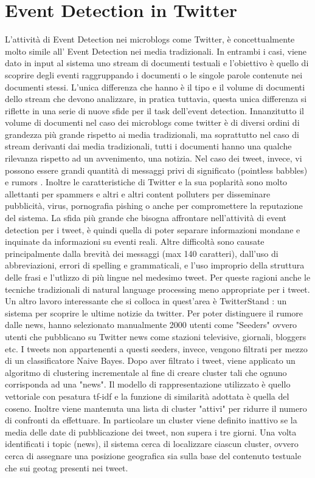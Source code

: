 \section{Event Detection in Twitter}
L'attività di Event Detection nei microblogs come Twitter, è concettualmente molto simile all' Event Detection nei media tradizionali. In entrambi i casi, viene dato in input al sistema  uno stream di documenti testuali e l'obiettivo è quello di scoprire degli eventi raggruppando i documenti o le singole parole contenute nei documenti stessi. L'unica differenza che hanno è il tipo e il volume di documenti dello stream che devono analizzare, in pratica tuttavia, questa unica differenza si riflette in una serie di nuove sfide per il task dell'event detection. 
Innanzitutto il volume di documenti nel caso dei microblogs come twitter  è di diversi ordini di grandezza più grande rispetto ai media tradizionali, ma soprattutto nel caso di stream derivanti dai media tradizionali, tutti i documenti hanno una qualche rilevanza rispetto ad un avvenimento, una notizia. Nel caso dei tweet, invece, vi possono essere grandi quantità di messaggi privi di significato (pointless babbles) \cite{DBLP:conf/icwsm/HurlockW11} e rumors \cite{Castillo:2011:ICT:1963405.1963500}. Inoltre le caratteristiche di Twitter e la sua poplarità sono molto allettanti per spammers e altri e altri content polluters \cite{DBLP:conf/icwsm/LeeEC11} per disseminare pubblicità, virus, pornografia pishing o anche per compromettere la reputazione del sistema. La sfida più grande che bisogna affrontare nell'attività di event detection per i tweet, è quindi quella di poter separare informazioni mondane e inquinate da informazioni su eventi reali. Altre difficoltà sono causate principalmente dalla brevità dei messaggi (max 140 caratteri), dall'uso di abbreviazioni, errori di spelling e grammaticali, e l'uso improprio della struttura delle frasi e l'utlizzo di più lingue nel medesimo tweet. Per queste ragioni anche le tecniche tradizionali di natural language processing  meno appropriate per i tweet. Un altro lavoro interessante che si colloca in quest'area è TwitterStand \cite{Sankaranarayanan:2009:TNT:1653771.1653781}: un sistema per scoprire le ultime  notizie da twitter. Per poter distinguere il rumore dalle news, hanno selezionato manualmente 2000 utenti come "Seeders" ovvero utenti che pubblicano su Twitter news come stazioni televisive, giornali, bloggers etc. I tweets non appartenenti a questi seeders, invece, vengono filtrati per mezzo di un classificatore Naive Bayes. Dopo aver filtrato i tweet, viene applicato un algoritmo di clustering incrementale al fine di creare cluster tali che ognuno corrisponda ad una "news". Il modello di rappresentazione utilizzato è quello vettoriale con pesatura tf-idf e la funzione di similarità adottata è quella del coseno.  Inoltre viene mantenuta una lista di cluster "attivi" per ridurre il numero di confronti da effettuare. In particolare un cluster viene definito inattivo se la media delle date di pubblicazione dei tweet, non supera i tre giorni. Una volta identificati i topic (news), il sistema cerca di localizzare ciascun cluster, ovvero cerca di assegnare una posizione geografica sia sulla base del contenuto testuale che sui geotag presenti nei tweet.
